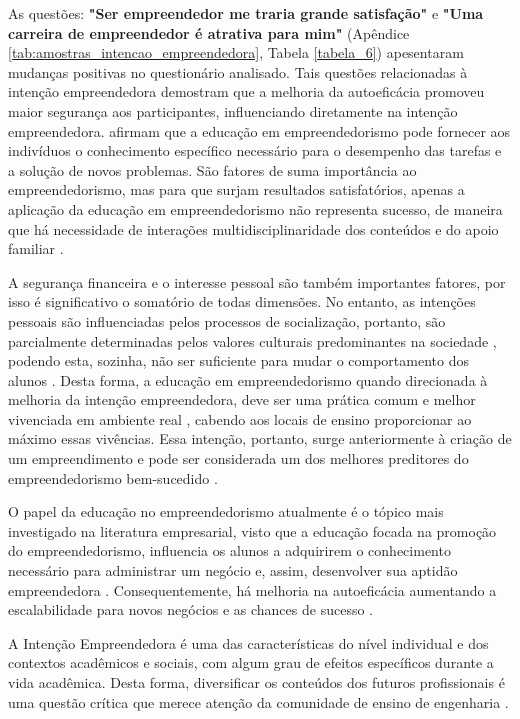 As questões: \textbf{"Ser empreendedor me traria grande satisfação"} e \textbf{"Uma carreira de empreendedor é atrativa para mim"} (Apêndice \ref{tab:amostras_intencao_empreendedora}, Tabela \ref{tabela_6}) apesentaram mudanças positivas no questionário analisado. Tais questões relacionadas à intenção empreendedora demostram que a melhoria da autoeficácia promoveu maior segurança aos participantes, influenciando diretamente na intenção empreendedora.  afirmam que a educação em empreendedorismo pode fornecer aos indivíduos o conhecimento específico necessário para o desempenho das tarefas e a solução de novos problemas. São fatores de suma importância ao empreendedorismo, mas para que surjam resultados satisfatórios, apenas a aplicação da educação em empreendedorismo não representa sucesso, de maneira que há necessidade de interações multidisciplinaridade dos conteúdos e do apoio familiar \cite{edelman_impact_2016}. 

A segurança financeira e o interesse pessoal são também importantes fatores, por isso é significativo o somatório de todas dimensões. No entanto, as intenções pessoais são influenciadas pelos processos de socialização, portanto, são parcialmente determinadas pelos valores culturais predominantes na sociedade \cite{schwartz_les_2006}, podendo esta, sozinha, não ser suficiente para mudar o comportamento dos alunos \cite{adelaja_students_2018}. Desta forma, a educação em empreendedorismo quando direcionada à melhoria da intenção empreendedora, deve ser uma prática comum e melhor vivenciada em ambiente real \cite{damanpour_phases_2006}, cabendo aos locais de ensino proporcionar ao máximo essas vivências. Essa intenção, portanto, surge anteriormente à criação de um empreendimento e pode ser considerada um dos melhores preditores do empreendedorismo bem-sucedido \cite{ajzen_attitudes_1987,krueger_competing_2000,garcia-rodriguez_entrepreneurial_2017}.

O papel da educação no empreendedorismo atualmente é o tópico mais investigado na literatura empresarial, visto  que a educação focada na promoção do empreendedorismo, influencia os alunos a adquirirem o conhecimento necessário para administrar um negócio e, assim,  desenvolver sua aptidão empreendedora \cite{nowinski_impact_2019}. Consequentemente, há melhoria na autoeficácia \cite{egerova_does_2017} aumentando a escalabilidade para novos negócios e as chances de sucesso \cite{kolstad_education_2015}.

A Intenção Empreendedora é uma das características do nível individual e dos contextos acadêmicos e sociais, com algum grau de efeitos específicos durante a vida acadêmica. Desta forma, diversificar os conteúdos dos futuros profissionais é uma questão crítica que merece atenção da comunidade de ensino de engenharia \cite{gilmartin_entrepreneurial_2019}.

